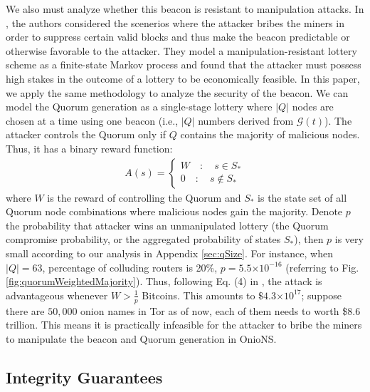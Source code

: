 \documentclass[USenglish,oneside,twocolumn]{article}
\providecommand{\e}[1]{\ensuremath{\times 10^{#1}}}
\begin{document}
We also must analyze whether this beacon is resistant to manipulation attacks. In \cite{BonneauCG15}, the authors considered the scenerios where the attacker bribes the miners in order to suppress certain valid blocks and thus make the beacon predictable or otherwise favorable to the attacker.  They model a manipulation-resistant lottery scheme as a finite-state Markov process and found that the attacker must possess high stakes in the outcome of a lottery to be economically feasible. In this paper, we apply the same  methodology to analyze the security of the beacon. We can model the Quorum generation as a single-stage lottery where $|Q|$ nodes are chosen at a time using one beacon (i.e., $|Q|$ numbers derived from $ \mathcal{G}(t) $). The attacker controls the Quorum only if $Q$ contains the majority of malicious nodes. Thus, it has a binary reward function:
\begin{eqnarray}
A(s) = \left\{
\begin{array}{ll}
W \quad: \quad s\in S_*\\
0 \quad: \quad s\notin S_*
\end{array}
\right.
\end{eqnarray}
where $W$ is the reward of controlling the Quorum and $S_*$ is the state set of all Quorum node combinations where malicious nodes gain the majority. Denote $p$ the probability that attacker wins an unmanipulated lottery (the Quorum compromise probability, or the aggregated probability of states $S_*$), then $p$ is very small according to our analysis in Appendix \ref{sec:qSize}. For instance, when $|Q|=63$, percentage of colluding routers is 20\%, $p = 5.5\e{-16} $ (referring to Fig. \ref{fig:quorumWeightedMajority}). Thus, following Eq. (4) in \cite{BonneauCG15}, the attack is advantageous whenever $W>\frac{1}{p}$ Bitcoins. This amounts to  $\$4.3\e{17}$; suppose there are $50,000$ onion names in Tor as of now, each of them needs to worth \$8.6 trillion. This means it is practically infeasible for the attacker to bribe the miners to manipulate the beacon and Quorum generation in OnioNS. %

\subsection{Integrity Guarantees}
\label{sec:integrityG}
\end{document}
